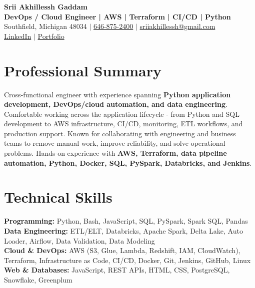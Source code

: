 \documentclass[letterpaper,10pt]{article}
\begin{document}
\fontsize{9.35pt}{10.45pt}\selectfont

\begin{center}
    {\LARGE \textbf{Srii Akhillessh Gaddam}} \\[-1pt]
    \textbf{DevOps / Cloud Engineer | AWS | Terraform | CI/CD | Python} \\[2pt]
    Southfield, Michigan 48034 $|$
    \href{tel:6468752400}{646-875-2400} $|$
    \href{mailto:sriiakhillessh@gmail.com}{sriiakhillessh@gmail.com} \\[1pt]
    \href{https://www.linkedin.com/in/srii-akhiilessh-gaddam-b48668191/}{LinkedIn} $|$
    \href{https://sriiakhillesshg.github.io/portfolio/}{Portfolio}
\end{center}
\vspace{-8pt}

\section{Professional Summary}
\small{Cross-functional engineer with experience spanning \textbf{Python application development, DevOps/cloud automation, and data engineering}. Comfortable working across the application lifecycle - from Python and SQL development to AWS infrastructure, CI/CD, monitoring, ETL workflows, and production support. Known for collaborating with engineering and business teams to remove manual work, improve reliability, and solve operational problems. Hands-on experience with \textbf{AWS, Terraform, data pipeline automation, Python, Docker, SQL, PySpark, Databricks, and Jenkins}.}

\section{Technical Skills}
\small{
\textbf{Programming:} Python, Bash, JavaScript, SQL, PySpark, Spark SQL, Pandas \\
\textbf{Data Engineering:} ETL/ELT, Databricks, Apache Spark, Delta Lake, Auto Loader, Airflow, Data Validation, Data Modeling \\
\textbf{Cloud \& DevOps:} AWS (S3, Glue, Lambda, Redshift, IAM, CloudWatch), Terraform, Infrastructure as Code, CI/CD, Docker, Git, Jenkins, GitHub, Linux \\
\textbf{Web \& Databases:} JavaScript, REST APIs, HTML, CSS, PostgreSQL, Snowflake, Greenplum
}
\end{document}
